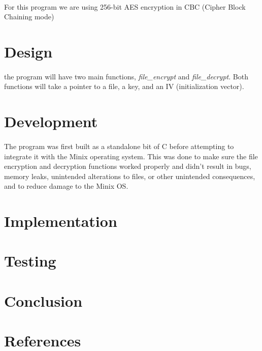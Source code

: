 \documentclass{article}
\begin{document}
\paragraph{}For this program we are using 256-bit AES encryption in CBC (Cipher Block Chaining mode)

\section{Design}
\paragraph{}the program will have two main functions, \textit{file\_encrypt} and \textit{file\_decrypt}. Both functions will take a pointer to a file, a key, and an IV (initialization vector).


\section{Development}
\paragraph{}The program was first built as a standalone bit of C before attempting to integrate it with the Minix operating system. This was done to make sure the file encryption and decryption functions worked properly and didn't result in bugs, memory leaks, unintended alterations to files, or other unintended consequences, and to reduce damage to the Minix OS.



\section{Implementation}
\paragraph{}

\section{Testing}

\section{Conclusion}
\paragraph{}

\section{References}
\end{document}
